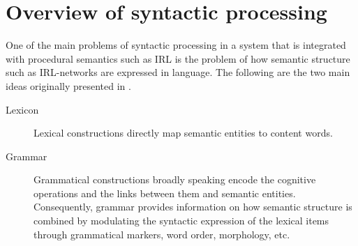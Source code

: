 \section{Overview of syntactic processing}
\label{s:syntactic-processing-overview}
One of the main problems of syntactic processing in a system that
is integrated with procedural semantics such as IRL is the problem
of how semantic structure such as IRL-networks are expressed
in language. The following are the two main ideas originally presented
in \citet{steels2005planning}.
\begin{description}
\item[Lexicon] Lexical constructions directly map semantic entities 
to content words.
\item[Grammar] Grammatical constructions broadly speaking encode
the cognitive operations and the links between them and 
semantic entities. Consequently, grammar 
provides information on how semantic structure is combined \citep{steels2011phrasal}
by modulating the syntactic expression of the lexical items through
grammatical markers, word order, morphology, etc. 
\end{description}

